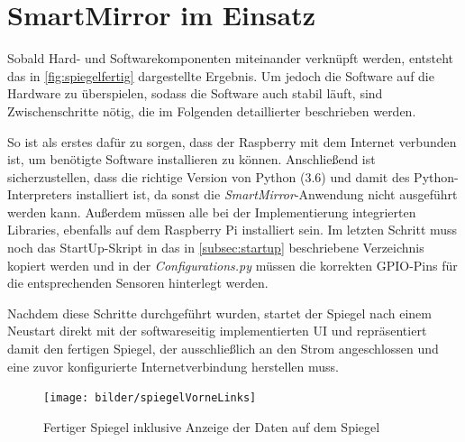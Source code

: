 \section{SmartMirror im Einsatz}
\label{sec:imEinsatz}

Sobald Hard- und Softwarekomponenten miteinander verknüpft werden, entsteht das in \autoref{fig:spiegelfertig} dargestellte Ergebnis.
Um jedoch die Software auf die Hardware zu überspielen, sodass die Software auch stabil läuft, sind Zwischenschritte nötig, die im Folgenden detaillierter beschrieben werden.

So ist als erstes dafür zu sorgen, dass der Raspberry mit dem Internet verbunden ist, um benötigte Software installieren zu können. Anschließend ist sicherzustellen, dass die richtige Version von Python (3.6) und damit des Python-Interpreters installiert ist, da sonst die \textit{SmartMirror}-Anwendung nicht ausgeführt werden kann. 
Außerdem müssen alle bei der Implementierung integrierten Libraries, ebenfalls auf dem Raspberry Pi installiert sein. 
Im letzten Schritt muss noch das StartUp-Skript in das in \autoref{subsec:startup} beschriebene Verzeichnis kopiert werden und in der \textit{Configurations.py} müssen die korrekten GPIO-Pins für die entsprechenden Sensoren hinterlegt werden. 

Nachdem diese Schritte durchgeführt wurden, startet der Spiegel nach einem Neustart direkt mit der softwareseitig implementierten UI und repräsentiert damit den fertigen Spiegel, der ausschließlich an den Strom angeschlossen und eine zuvor konfigurierte Internetverbindung herstellen muss. 

\begin{figure}
	\centering
	\texttt{[image: bilder/spiegelVorneLinks]}
	\caption[Fertiger Spiegel inklusive Anzeige der Daten]{Fertiger Spiegel inklusive Anzeige der Daten auf dem Spiegel}
	\label{fig:spiegelfertig}
\end{figure}
